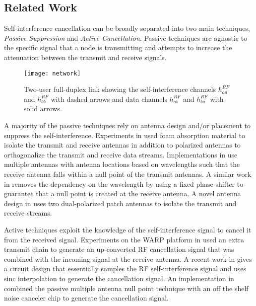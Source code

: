 \documentclass[12pt, journal,draftcls,letterpaper,onecolumn]{IEEEtran}
\begin{document}
\subsection{Related Work}
\label{subsec:related_work}
Self-interference cancellation can be broadly separated into two main techniques, \emph{Passive Suppression} and \emph{Active Cancellation}.  Passive techniques are agnostic to the specific signal that a node is transmitting and attempts to increase the attenuation between the transmit and receive signals.  
\begin{figure}[htp] 
\begin{center} 
  \texttt{[image: network]}
\caption[fig:system]{Two-user full-duplex link showing the self-interference channels $h_{aa}^{RF}$ and $h_{bb}^{RF}$ with dashed arrows and data channels $h_{ab}^{RF}$ and $h_{ba}^{RF}$ with solid arrows.} 
  \label{fig:network}
\end{center}    
\end{figure}    
A majority of the passive techniques rely on antenna design and/or placement to suppress the self-interference.  Experiments in \cite{2013_Evan_TWC_passive} used foam absorption material to isolate the transmit and receive antennas in addition to polarized antennas to orthogonalize the transmit and receive data streams.  Implementations in \cite{2011_Antenna_cancel,2012_Choi_Asilomar} use multiple antennas with antenna locations based on wavelengths such that the receive antenna falls within a null point of the transmit antennas.  A similar work in \cite{2012_MIDU} removes the dependency on the wavelength by using a fixed phase shifter to guarantee that a null point is created at the receive antenna.  A novel antenna design in\cite{2010_Patch_Sweden} uses two dual-polarized patch antennas to isolate the transmit and receive streams.  

Active techniques exploit the knowledge of the self-interference signal to cancel it from the received signal.  Experiments on the WARP platform in \cite{2012_Melissa_TWC} used an extra transmit chain to generate an up-converted RF cancellation signal that was combined with the incoming signal at the receive antenna.  A recent work in \cite{2013_Stanford_Sigcomm} gives a circuit design that essentially samples the RF self-interference signal and uses sinc interpolation to generate the cancellation signal.  An implementation in \cite{2010_low_power} combined the passive multiple antenna null point technique with an off the shelf noise canceler chip to generate the cancellation signal.  
\end{document}
